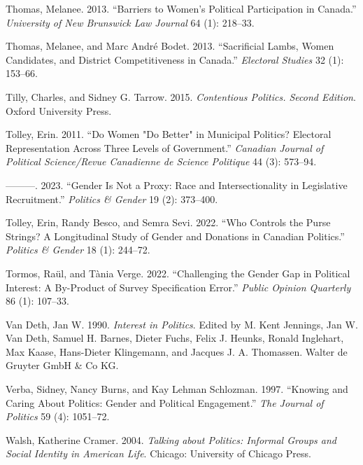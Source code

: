 \documentclass[
  letterpaper,
  DIV=11,
  numbers=noendperiod]{scrreprt}
\newlength{\cslhangindent}
\newlength{\cslentryspacingunit} %
\newenvironment{CSLReferences}[2] %
 {%
  \setlength{\parindent}{0pt}
  \ifodd #1
  \let\oldpar\par
  \def\par{\hangindent=\cslhangindent\oldpar}
  \fi
  \setlength{\parskip}{#2\cslentryspacingunit}
 }%
 {}
\begin{document}
\begin{CSLReferences}{1}{0}
\leavevmode{}%
Thomas, Melanee. 2013. {``{Barriers to Women's Political Participation
in Canada}.''} \emph{University of New Brunswick Law Journal} 64 (1):
218--33.

\leavevmode{}%
Thomas, Melanee, and Marc André Bodet. 2013. {``{Sacrificial Lambs,
Women Candidates, and District Competitiveness in Canada}.''}
\emph{Electoral Studies} 32 (1): 153--66.

\leavevmode{}%
Tilly, Charles, and Sidney G. Tarrow. 2015. \emph{{Contentious Politics.
Second Edition}}. Oxford University Press.

\leavevmode{}%
Tolley, Erin. 2011. {``{Do Women "Do Better" in Municipal Politics?
Electoral Representation Across Three Levels of Government}.''}
\emph{Canadian Journal of Political Science/Revue Canadienne de Science
Politique} 44 (3): 573--94.

\leavevmode{}%
---------. 2023. {``{Gender Is Not a Proxy: Race and Intersectionality
in Legislative Recruitment}.''} \emph{Politics \& Gender} 19 (2):
373--400.

\leavevmode{}%
Tolley, Erin, Randy Besco, and Semra Sevi. 2022. {``{Who Controls the
Purse Strings? A Longitudinal Study of Gender and Donations in Canadian
Politics}.''} \emph{Politics \& Gender} 18 (1): 244--72.

\leavevmode{}%
Tormos, Raül, and Tània Verge. 2022. {``{Challenging the Gender Gap in
Political Interest: A By-Product of Survey Specification Error}.''}
\emph{Public Opinion Quarterly} 86 (1): 107--33.

\leavevmode{}%
Van Deth, Jan W. 1990. \emph{Interest in Politics}. Edited by M. Kent
Jennings, Jan W. Van Deth, Samuel H. Barnes, Dieter Fuchs, Felix J.
Heunks, Ronald Inglehart, Max Kaase, Hans-Dieter Klingemann, and Jacques
J. A. Thomassen. Walter de Gruyter GmbH \& Co KG.

\leavevmode{}%
Verba, Sidney, Nancy Burns, and Kay Lehman Schlozman. 1997. {``{Knowing
and Caring About Politics: Gender and Political Engagement}.''}
\emph{The Journal of Politics} 59 (4): 1051--72.

\leavevmode{}%
Walsh, Katherine Cramer. 2004. \emph{{Talking about Politics: Informal
Groups and Social Identity in American Life}}. Chicago: University of
Chicago Press.


\end{CSLReferences}
\end{document}
